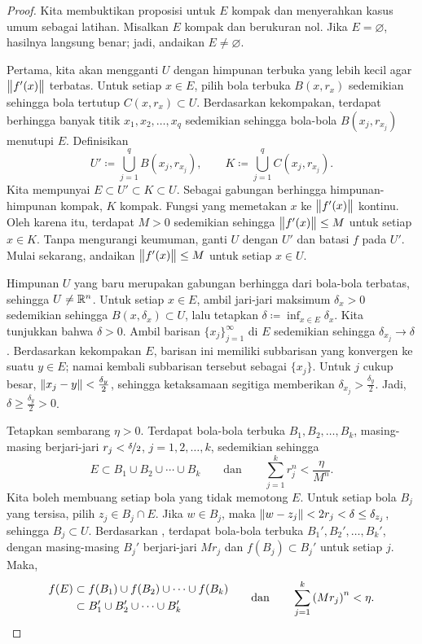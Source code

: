 \begin{proof}
Kita membuktikan proposisi untuk $E$ kompak dan menyerahkan kasus umum sebagai
latihan. Misalkan $E$ kompak dan berukuran nol. Jika $E=\varnothing$, hasilnya
langsung benar; jadi, andaikan $E\neq\varnothing$.

Pertama, kita akan mengganti $U$ dengan himpunan terbuka yang lebih kecil agar
$\bigl\lVert {f'(x)} \bigr\rVert$ terbatas. Untuk setiap $x\in E$, pilih bola terbuka $B(x,r_x)$
sedemikian sehingga bola tertutup $C(x,r_x)\subset U$. Berdasarkan kekompakan,
terdapat berhingga banyak titik $x_1,x_2,\ldots,x_q$ sedemikian sehingga
bola-bola $B(x_j,r_{x_j})$ menutupi $E$. Definisikan
\begin{equation*}
U' \coloneqq \bigcup_{j=1}^q B(x_j,r_{x_j}), \qquad
K \coloneqq \bigcup_{j=1}^q C(x_j,r_{x_j}).
\end{equation*}
Kita mempunyai $E\subset U'\subset K\subset U$. Sebagai gabungan berhingga
himpunan-himpunan kompak, $K$ kompak. Fungsi yang memetakan $x$ ke
$\bigl\lVert {f'(x)} \bigr\rVert$ kontinu. Oleh karena itu, terdapat $M>0$ sedemikian sehingga
$\bigl\lVert {f'(x)} \bigr\rVert\leq M$ untuk setiap $x\in K$. Tanpa mengurangi keumuman, ganti
$U$ dengan $U'$ dan batasi $f$ pada $U'$. Mulai sekarang, andaikan
$\bigl\lVert {f'(x)} \bigr\rVert\leq M$ untuk setiap $x\in U$.

Himpunan $U$ yang baru merupakan gabungan berhingga dari bola-bola terbatas,
sehingga $U\neq{\mathbb{R}}^n$. Untuk setiap $x\in E$, ambil jari-jari maksimum
$\delta_x>0$ sedemikian sehingga
$B(x,\delta_x)\subset U$, lalu tetapkan
$\delta\coloneqq\inf_{x\in E}\delta_x$. Kita tunjukkan bahwa $\delta>0$.
Ambil barisan $\{x_j\}_{j=1}^\infty$ di $E$ sedemikian sehingga
$\delta_{x_j}\to\delta$. Berdasarkan kekompakan $E$, barisan ini memiliki
subbarisan yang konvergen ke suatu $y\in E$; namai kembali subbarisan tersebut
sebagai $\{x_j\}$. Untuk $j$ cukup besar,
$\lVert {x_j-y} \rVert<\frac{\delta_y}{2}$, sehingga ketaksamaan segitiga memberikan
$\delta_{x_j}>\frac{\delta_y}{2}$. Jadi,
$\delta\geq\frac{\delta_y}{2}>0$.

Tetapkan sembarang $\eta>0$. Terdapat bola-bola terbuka
$B_1,B_2,\ldots,B_k$, masing-masing berjari-jari
$r_j<\nicefrac{\delta}{2}$, $j=1,2,\ldots,k$, sedemikian sehingga
\begin{equation*}
E \subset B_1 \cup B_2 \cup \cdots \cup B_k
\qquad \text{dan} \qquad
\sum_{j=1}^k r_j^n < \frac{\eta}{M^n}.
\end{equation*}
Kita boleh membuang setiap bola yang tidak memotong $E$. Untuk setiap bola
$B_j$ yang tersisa, pilih $z_j\in B_j\cap E$. Jika $w\in B_j$, maka
$\lVert {w-z_j} \rVert<2r_j<\delta\leq\delta_{z_j}$, sehingga $B_j\subset U$.
Berdasarkan , terdapat bola-bola terbuka
$B_1',B_2',\ldots,B_k'$, dengan masing-masing $B_j'$ berjari-jari $Mr_j$ dan
$f(B_j)\subset B_j'$ untuk setiap $j$. Maka,
\begin{equation*}
\begin{aligned}
f(E)
&
\subset f(B_1) \cup f(B_2) \cup \cdots \cup f(B_k)
\\
&
\subset B_1' \cup B_2' \cup \cdots \cup B_k'
\end{aligned}
\qquad \text{dan} \qquad
\sum_{j=1}^k {(Mr_j)}^n
 < \eta. \qedhere
\end{equation*}
\end{proof}

